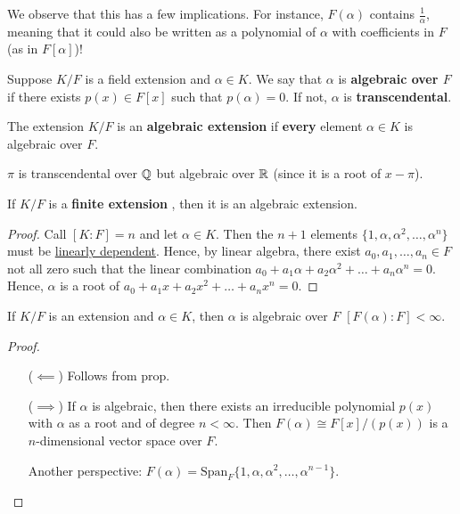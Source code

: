 \documentclass[12pt]{article}
\begin{document}
    We observe that this has a few implications. For instance, $F(\alpha)$ contains $\frac{1}{\alpha}$, meaning that it could also be written as a polynomial of $\alpha$ with coefficients in $F$ (as in $F[\alpha]$)!

     Suppose $K/F$ is a field extension and $\alpha\in K$. We say that $\alpha$ is \textbf{algebraic over $F$} if there exists $p(x)\in F[x]$ such that $p(\alpha)=0$. If not, $\alpha$ is \textbf{transcendental}.

     The extension $K/F$ is an \textbf{algebraic extension} if \textbf{every} element $\alpha\in K$ is algebraic over $F$.

    \eg $\pi$ is transcendental over $\mathbb{Q}$ but algebraic over $\mathbb{R}$ (since it is a root of $x-\pi$).

    \begin{proposition}
        If $K/F$ is a \textbf{finite extension} , then it is an algebraic extension.
    \end{proposition}
    \begin{proof}
        Call $[K:F]=n$ and let $\alpha\in K$. Then the $n+1$ elements $\{1,\alpha,\alpha^2,\dots, \alpha^n\}$ must be \uline{linearly dependent}. Hence, by linear algebra, there exist $a_0,a_1,\dots,a_n\in F$ not all zero such that the linear combination $a_0+a_1\alpha+a_2\alpha^2+\dots +a_n\alpha^n=0$. Hence, $\alpha$ is a root of $a_0+a_1x+a_2x^2+\dots +a_nx^n=0$.
    \end{proof}

    \begin{corollary}
        If $K/F$ is an extension and $\alpha\in K$, then $\alpha$ is algebraic over $F$ \ifnif $[F(\alpha):F]<\infty$.
    \end{corollary}
    \begin{proof}\hfill
        \begin{enumerate}[align=left]
            \item[($\impliedby$)] Follows from prop.
            \item[($\implies$)] If $\alpha$ is algebraic, then there exists an irreducible polynomial $p(x)$ with $\alpha$ as a root and of degree $n<\infty$. Then $F(\alpha)\cong F[x]/(p(x))$ is a $n$-dimensional vector space over $F$.
            
            Another perspective: $F(\alpha)=\mathrm{Span}_F\{1,\alpha,\alpha^2,\dots ,\alpha^{n-1}\}$.
        \end{enumerate}
    \end{proof}
\end{document}
